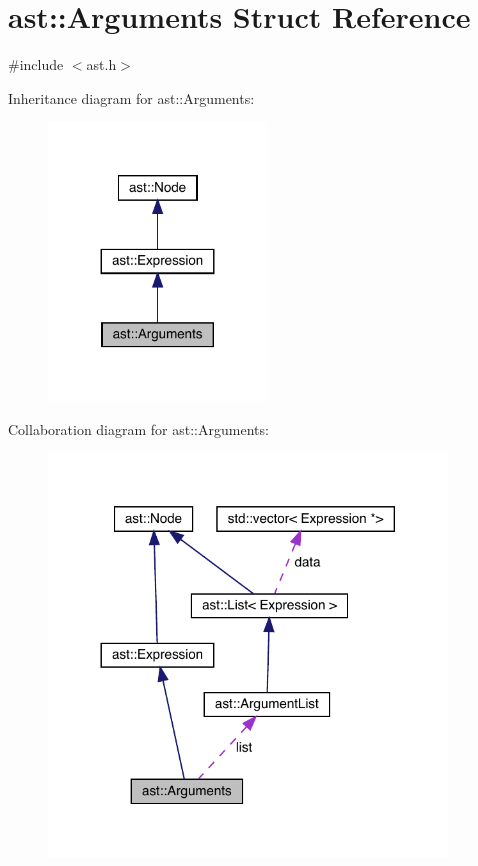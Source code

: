 \hypertarget{structast_1_1_arguments}{}\section{ast\+:\+:Arguments Struct Reference}
\label{structast_1_1_arguments}


{\ttfamily \#include $<$ast.\+h$>$}



Inheritance diagram for ast\+:\+:Arguments\+:\nopagebreak
\begin{figure}[H]
\begin{center}
\leavevmode
\includegraphics[width=164pt]{structast_1_1_arguments__inherit__graph}
\end{center}
\end{figure}


Collaboration diagram for ast\+:\+:Arguments\+:\nopagebreak
\begin{figure}[H]
\begin{center}
\leavevmode
\includegraphics[width=300pt]{structast_1_1_arguments__coll__graph}
\end{center}
\end{figure}
